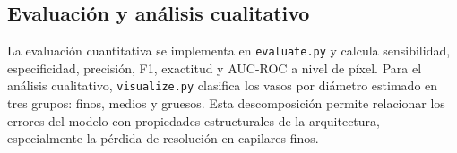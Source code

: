 \subsection{Evaluación y análisis cualitativo}
La evaluación cuantitativa se implementa en \texttt{evaluate.py} y calcula sensibilidad, especificidad, precisión, F1, exactitud y AUC-ROC a nivel de píxel. Para el análisis cualitativo, \texttt{visualize.py} clasifica los vasos por diámetro estimado en tres grupos: finos, medios y gruesos. Esta descomposición permite relacionar los errores del modelo con propiedades estructurales de la arquitectura, especialmente la pérdida de resolución en capilares finos.
